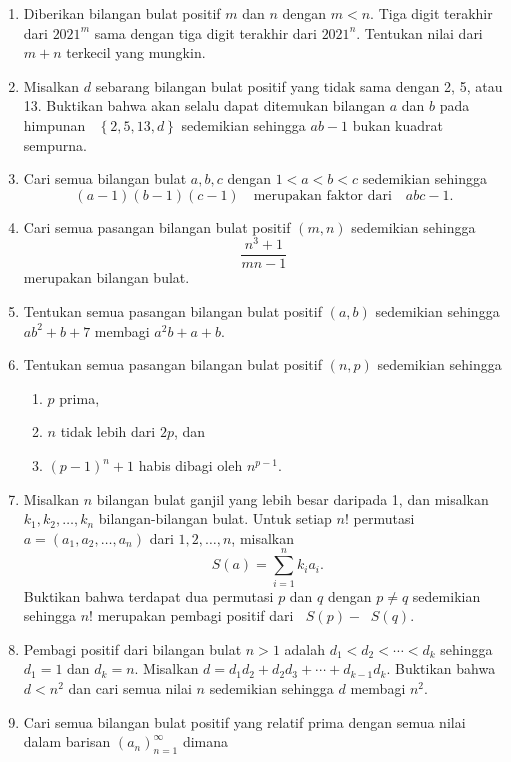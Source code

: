 \documentclass[12pt]{article}
\newcommand*\lrbr[1]{\mathop{}\!\left\lbrace#1\right\rbrace}
\newcommand*\func[2]{\mathop{}\!{#1}{\left({#2}\right)}}
\begin{document}
\begin{enumerate}[leftmargin=*]
		\item Diberikan bilangan bulat positif $ m $ dan $ n $ dengan $ m < n $. Tiga digit terakhir dari $ 2021^{m} $ sama dengan tiga digit terakhir dari $ 2021^{n} $. Tentukan nilai dari $ m + n $ terkecil yang mungkin.
		\item Misalkan $ d $ sebarang bilangan bulat positif yang tidak sama dengan 2, 5, atau 13. Buktikan bahwa akan selalu dapat ditemukan bilangan $ a $ dan $ b $ pada himpunan $ \lrbr{2, 5, 13, d} $ sedemikian sehingga $ ab - 1 $ bukan kuadrat sempurna.
		\item Cari semua bilangan bulat $ a, b, c $ dengan $ 1 < a < b < c $ sedemikian sehingga
		\[ \left(a - 1\right)\left(b - 1\right)\left(c - 1\right) \quad \mbox{merupakan faktor dari} \quad abc - 1. \]
		\item Cari semua pasangan bilangan bulat positif $ \left(m, n\right) $ sedemikian sehingga
		\[ \frac{n^{3} + 1}{mn - 1} \]
		merupakan bilangan bulat.
		\item Tentukan semua pasangan bilangan bulat positif $ \left(a, b\right) $ sedemikian sehingga $ ab^{2} + b + 7 $ membagi $ a^{2}b + a + b $.
		\item Tentukan semua pasangan bilangan bulat positif $ \left(n, p\right) $ sedemikian sehingga
		\begin{enumerate}
			\item $ p $ prima,
			\item $ n $ tidak lebih dari $ 2p $, dan
			\item $ \left(p - 1\right)^{n} + 1 $ habis dibagi oleh $ n^{p - 1} $.
		\end{enumerate}
		\item Misalkan $ n $ bilangan bulat ganjil yang lebih besar daripada 1, dan misalkan $ k_{1}, k_{2}, \dots, k_{n} $ bilangan-bilangan bulat. Untuk setiap $ n! $ permutasi $ a = \left(a_{1}, a_{2}, \dots, a_{n}\right) $ dari $ 1, 2, \dots, n $, misalkan
		\[ \func{S}{a} = \sum_{i = 1}^{n}{k_{i}a_{i}}. \]
		Buktikan bahwa terdapat dua permutasi $ p $ dan $ q $ dengan $ p \ne q $ sedemikian sehingga $ n! $ merupakan pembagi positif dari $ \func{S}{p} - \func{S}{q} $.
		\item Pembagi positif dari bilangan bulat $ n > 1 $ adalah $ d_{1} < d_{2} < \cdots < d_{k} $ sehingga $ d_{1} = 1 $ dan $ d_{k} = n $. Misalkan $ d = d_{1}d_{2} + d_{2}d_{3} + \cdots + d_{k - 1}d_{k} $. Buktikan bahwa $ d < n^{2} $ dan cari semua nilai $ n $ sedemikian sehingga $ d $ membagi $ n^{2} $.
		\item Cari semua bilangan bulat positif yang relatif prima dengan semua nilai dalam barisan $ \left(a_{n}\right)_{n = 1}^{\infty} $ dimana

\end{enumerate}
\end{document}
